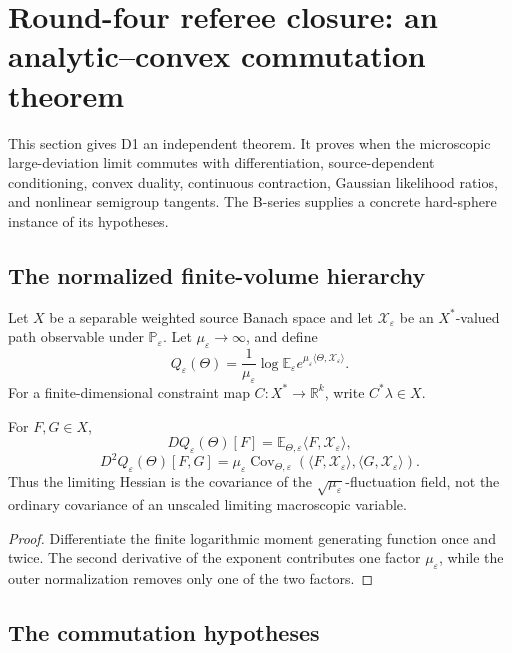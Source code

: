 \section{Round-four referee closure: an analytic--convex commutation theorem}
\label{sec:r3-d1}

This section gives D1 an independent theorem.  It proves when the microscopic
large-deviation limit commutes with differentiation, source-dependent
conditioning, convex duality, continuous contraction, Gaussian likelihood
ratios, and nonlinear semigroup tangents.  The B-series supplies a concrete
hard-sphere instance of its hypotheses.

\subsection{The normalized finite-volume hierarchy}

Let \(X\) be a separable weighted source Banach space and let
\(\mathcal X_\varepsilon\) be an \(X^*\)-valued path observable under
\(\mathbb P_\varepsilon\).  Let
\(\mu_\varepsilon\to\infty\), and define
\[
 Q_\varepsilon(\Theta)
 =\frac1{\mu_\varepsilon}
 \log\mathbb E_\varepsilon
 e^{\mu_\varepsilon\langle\Theta,
 \mathcal X_\varepsilon\rangle}.
\]
For a finite-dimensional constraint map
\(C:X^*\to\mathbb R^k\), write \(C^*\lambda\in X\).

\begin{proposition}
\label{prop:r3-d1-normalization}
For \(F,G\in X\),
\[
 DQ_\varepsilon(\Theta)[F]
 =\mathbb E_{\Theta,\varepsilon}
 \langle F,\mathcal X_\varepsilon\rangle,
\]
\[
 D^2Q_\varepsilon(\Theta)[F,G]
 =\mu_\varepsilon
 \operatorname{Cov}_{\Theta,\varepsilon}
 \left(
 \langle F,\mathcal X_\varepsilon\rangle,
 \langle G,\mathcal X_\varepsilon\rangle
 \right).
\]
Thus the limiting Hessian is the covariance of the
\(\sqrt{\mu_\varepsilon}\)-fluctuation field, not the ordinary covariance of
an unscaled limiting macroscopic variable.
\end{proposition}

\begin{proof}
Differentiate the finite logarithmic moment generating function once and
twice.  The second derivative of the exponent contributes one factor
\(\mu_\varepsilon\), while the outer normalization removes only one of the two
factors.
\end{proof}

\subsection{The commutation hypotheses}


